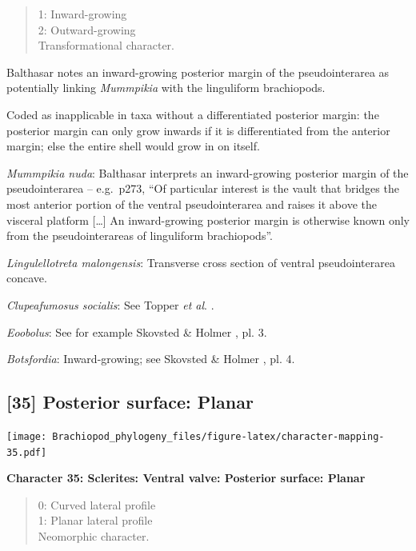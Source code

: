\documentclass[]{book}
\theoremstyle{definition}
\theoremstyle{definition}
\theoremstyle{definition}
\theoremstyle{remark}
\begin{document}
\begin{quote}
1: Inward-growing\\
2: Outward-growing\\
Transformational character.
\end{quote}

Balthasar \citeyearpar{Balthasar2008iMummpikia} notes an inward-growing
posterior margin of the pseudointerarea as potentially linking
\emph{Mummpikia} with the linguliform brachiopods.

Coded as inapplicable in taxa without a differentiated posterior margin:
the posterior margin can only grow inwards if it is differentiated from
the anterior margin; else the entire shell would grow in on itself.

\emph{Mummpikia nuda}: Balthasar \citeyearpar{Balthasar2008iMummpikia}
interprets an inward-growing posterior margin of the pseudointerarea --
e.g.~p273, ``Of particular interest is the vault that bridges the most
anterior portion of the ventral pseudointerarea and raises it above the
visceral platform {[}\ldots{}{]} An inward-growing posterior margin is
otherwise known only from the pseudointerareas of linguliform
brachiopods''.

\emph{Lingulellotreta malongensis}: Transverse cross section of ventral
pseudointerarea concave.

\emph{Clupeafumosus socialis}: See Topper \emph{et al}.
\citeyearpar{Topper2013Reappraisalof}.

\emph{Eoobolus}: See for example Skovsted \& Holmer
\citeyearpar{Skovsted2005EarlyCambrian}, pl. 3.

\emph{Botsfordia}: Inward-growing; see Skovsted \& Holmer
\citeyearpar{Skovsted2005EarlyCambrian}, pl. 4.

\hypertarget{posterior-surface-planar}{%
\subsection*{{[}35{]} Posterior surface:
Planar}\label{posterior-surface-planar}}

\texttt{[image: Brachiopod\_phylogeny\_files/figure-latex/character-mapping-35.pdf]}

\textbf{Character 35: Sclerites: Ventral valve: Posterior surface:
Planar}

\begin{quote}
0: Curved lateral profile\\
1: Planar lateral profile\\
Neomorphic character.
\end{quote}
\end{document}
